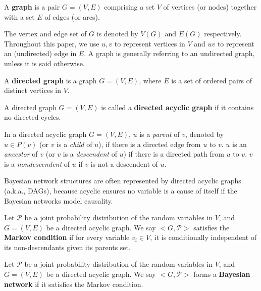 \begin{definition}
\label{def:graph}
A \textbf{graph} is a pair $G = (V, E)$ comprising a set $V$ of vertices (or nodes) together with a set $E$ of edges (or arcs).
\end{definition}
The vertex and edge set of $G$ is denoted by $V(G)$ and $E(G)$ respectively. Throughout this paper, we use $u,v$ to represent vertices in $V$ and $uv$ to represent an (undirected) edge in $E$. A graph is generally referring to an undirected graph, unless it is said otherwise. 

\begin{definition}
\label{def:digraph}
A \textbf{directed graph} is a graph $G=(V,E)$, where $E$ is a set of ordered pairs of distinct vertices in $V$.
\end{definition}

\begin{definition}
\label{def:dag}
A directed graph $G = (V, E)$ is called a \textbf{directed acyclic graph} if it contains no directed cycles. 
\end{definition}
In a directed acyclic graph $G=(V,E)$, $u$ is a \textit{parent} of $v$, denoted by $u \in P(v)$ (or $v$ is a \textit{child} of $u$), if there is a directed edge from $u$ to $v$. $u$ is an \textit{ancestor} of $v$ (or $v$ is a \textit{descendent} of $u$) if there is a directed path from $u$ to $v$. $v$ is a \textit{nondescendent} of $u$ if $v$ is not a descendent of $u$.

Bayesian network structures are often represented by directed acyclic graphs (a.k.a., DAGs), because acyclic ensures no variable is a cause of itself if the Bayesian networks model causality. 
\begin{definition}
\label{def:markov}
Let $\mathcal{P}$ be a joint probability distribution of the random variables in $V$, and $G=(V,E)$ be a directed acyclic graph. We say $<G, \mathcal{P}>$ satisfies the \textbf{Markov condition} if for every variable $v_i \in V$, it is conditionally independent of its non-descendants  given its parents set.
\end{definition}

\begin{definition}
\label{def:bn}
Let $\mathcal{P}$ be a joint probability distribution of the random variables in $V$, and $G=(V,E)$ be a directed acyclic graph. We say $<G, \mathcal{P}>$ forms a \textbf{Bayesian network} if it satisfies the Markov condition. 
\end{definition}

